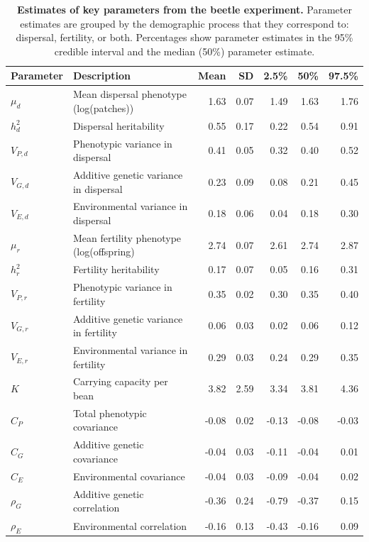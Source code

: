 \documentclass[11pt]{article}
\begin{document}
\newpage{}
\begin{table}[h]
\centering
\label{Estimates of key parameters from the beetle experiment}
\caption[Estimates of key parameters from the beetle experiment]{\textbf{Estimates of key parameters from the beetle experiment.} Parameter estimates are grouped by the demographic process that they correspond to: dispersal, fertility, or both. Percentages show parameter estimates in the 95\% credible interval and the median (50\%) parameter estimate.}\label{corr:estimates}\vspace{0.1in}
\begin{tabularx}{0.95\linewidth}{lXrrrrr}
\toprule
Parameter   & Description                               & Mean & SD   & 2.5\% & 50\% & 97.5\% \\ \midrule
$\mu_{d}$   & Mean dispersal phenotype (log(patches)) & 1.63 & 0.07 & 1.49   & 1.63 & 1.76   \\
$h^{2}_{d}$ & Dispersal heritability              & 0.55 & 0.17 & 0.22   & 0.54 & 0.91   \\
$V_{P,d}$   & Phenotypic variance in dispersal & 0.41 & 0.05 & 0.32   & 0.40 & 0.52   \\
$V_{G,d}$   & Additive genetic variance in dispersal & 0.23 & 0.09 & 0.08   & 0.21 & 0.45   \\
$V_{E,d}$   & Environmental variance in dispersal    & 0.18 & 0.06 & 0.04   & 0.18 & 0.30   \\ \midrule
$\mu_{r}$   & Mean fertility phenotype (log(offspring) & 2.74 & 0.07 & 2.61   & 2.74 & 2.87   \\
$h^{2}_{r}$ & Fertility heritability              & 0.17 & 0.07 & 0.05   & 0.16 & 0.31   \\
$V_{P,r}$   & Phenotypic variance in fertility & 0.35 & 0.02 & 0.30   & 0.35 & 0.40   \\
$V_{G,r}$   & Additive genetic variance in fertility & 0.06 & 0.03 & 0.02   & 0.06 & 0.12   \\
$V_{E,r}$   & Environmental variance in fertility    & 0.29 & 0.03 & 0.24   & 0.29 & 0.35   \\
$K$         & Carrying capacity per bean              & 3.82 & 2.59 & 3.34   & 3.81 & 4.36   \\ \midrule
$C_{P}$     & Total phenotypic covariance    &-0.08 & 0.02 &-0.13   &-0.08 &-0.03   \\
$C_{G}$     & Additive genetic covariance &-0.04 & 0.03 &-0.11   &-0.04 & 0.01   \\
$C_{E}$     & Environmental covariance   &-0.04 & 0.03 &-0.09   &-0.04 & 0.02   \\
$\rho_{G}$  & Additive genetic correlation  &-0.36 & 0.24 &-0.79   &-0.37 & 0.15   \\
$\rho_{E}$  & Environmental correlation     &-0.16 & 0.13 &-0.43   &-0.16 & 0.09   \\
\bottomrule
\end{tabularx}
\end{table}
\end{document}
